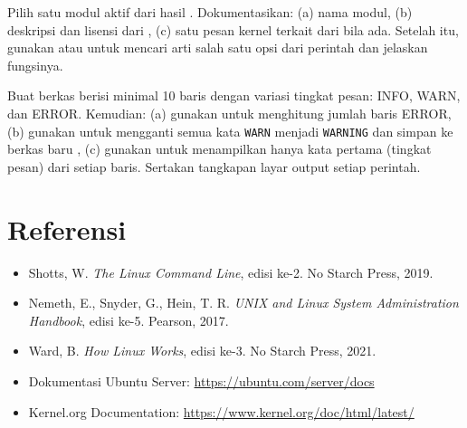 \begin{exercisebox}
Pilih satu modul aktif dari hasil . Dokumentasikan: (a) nama modul, (b) deskripsi dan lisensi dari , (c) satu pesan kernel terkait dari  bila ada. Setelah itu, gunakan  atau  untuk mencari arti salah satu opsi dari perintah  dan jelaskan fungsinya.
\end{exercisebox}

\begin{exercisebox}
Buat berkas  berisi minimal 10 baris dengan variasi tingkat pesan: INFO, WARN, dan ERROR. Kemudian: (a) gunakan  untuk menghitung jumlah baris ERROR, (b) gunakan  untuk mengganti semua kata \texttt{WARN} menjadi \texttt{WARNING} dan simpan ke berkas baru , (c) gunakan  untuk menampilkan hanya kata pertama (tingkat pesan) dari setiap baris. Sertakan tangkapan layar output setiap perintah.
\end{exercisebox}

\section{Referensi}

\begin{itemize}
    \item Shotts, W. \textit{The Linux Command Line}, edisi ke-2. No Starch Press, 2019.
    \item Nemeth, E., Snyder, G., Hein, T. R. \textit{UNIX and Linux System Administration Handbook}, edisi ke-5. Pearson, 2017.
    \item Ward, B. \textit{How Linux Works}, edisi ke-3. No Starch Press, 2021.
    \item Dokumentasi Ubuntu Server: \url{https://ubuntu.com/server/docs}
    \item Kernel.org Documentation: \url{https://www.kernel.org/doc/html/latest/}
\end{itemize}
